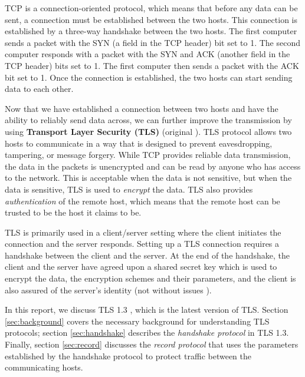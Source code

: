 TCP is a connection-oriented protocol, which means that before any data can be sent, a connection must be established between the two hosts. This connection is established by a three-way handshake between the two hosts. The first computer sends a packet with the SYN (a field in the TCP header) bit set to 1. The second computer responds with a packet with the SYN and ACK (another field in the TCP header) bits set to 1. The first computer then sends a packet with the ACK bit set to 1. Once the connection is established, the two hosts can start sending data to each other.

Now that we have established a connection between two hosts and have the ability to reliably send data across, we can further improve the transmission by using \textbf{Transport Layer Security (TLS)} \cite{rfc8446} (original \cite{rfc2246}). TLS protocol allows two hosts to communicate in a way that is designed to prevent eavesdropping, tampering, or message forgery. While TCP provides reliable data transmission, the data in the packets is unencrypted and can be read by anyone who has access to the network. This is acceptable when the data is not sensitive, but when the data is sensitive, TLS is used to \textit{encrypt} the data. TLS also provides \textit{authentication} of the remote host, which means that the remote host can be trusted to be the host it claims to be.

TLS is primarily used in a client/server setting where the client initiates the connection and the server responds. Setting up a TLS connection requires a handshake between the client and the server. At the end of the handshake, the client and the server have agreed upon a shared secret key which is used to encrypt the data, the encryption schemes and their parameters, and the client is also assured of the server's identity (not without issues \cite{rfc6962, tlsCertificateIssues}).

In this report, we discuss TLS 1.3 \cite{rfc8446}, which is the latest version of TLS. Section \ref*{sec:background} covers the necessary background for understanding TLS protocols; section \ref*{sec:handshake} describes the \textit{handshake protocol} in TLS 1.3. Finally, section \ref*{sec:record} discusses the \textit{record protocol} that uses the parameters established by the handshake protocol to protect traffic between the communicating hosts.

